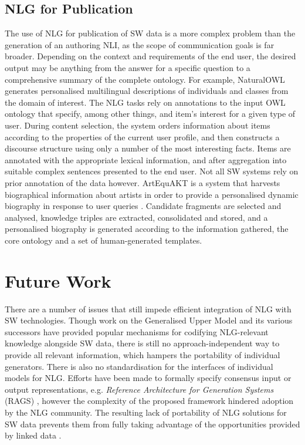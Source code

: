 \documentclass{acm_proc_article-sp}
\begin{document}
\subsection{NLG for Publication}
The use of NLG for publication of SW data is a more complex problem than the generation of an authoring NLI, as the scope of communication goals is far broader. Depending on the context and requirements of the end user, the desired output may be anything from the answer for a specific question to a comprehensive summary of the complete ontology.
For example, NaturalOWL \cite{56} generates personalised multilingual descriptions of individuals and classes from the domain of interest. The NLG tasks rely on annotations to the input OWL ontology that specify, among other things, and item's interest for a given type of user. During content selection, the system orders information about items according to the properties of the current user profile, and then constructs a discourse structure using only a number of the most interesting facts. Items are annotated with the appropriate lexical information, and after aggregation into suitable complex sentences presented to the end user.
Not all SW systems rely on prior annotation of the data however. ArtEquAKT is a system that harvests biographical information about artists in order to provide a personalised dynamic biography in response to user queries \cite{121}. Candidate fragments are selected and analysed, knowledge triples are extracted, consolidated and stored, and a personalised biography is generated according to the information gathered, the core ontology and a set of human-generated templates.


\section{Future Work}
There are a number of issues that still impede efficient integration of NLG with SW technologies. Though work on the Generalised Upper Model \cite{10} and its various successors have provided popular mechanisms for codifying NLG-relevant knowledge alongside SW data, there is still no approach-independent way to provide all relevant information, which hampers the portability of individual generators. There is also no standardisation for the interfaces of individual models for NLG. Efforts have been made to formally specify consensus input or output representations, e.g. \textit{Reference Architecture for Generation Systems} (RAGS) \cite{88}, however the complexity of the proposed framework hindered adoption by the NLG community. The resulting lack of portability of NLG solutions for SW data prevents them from fully taking advantage of the opportunities provided by linked data \cite{22}.
\end{document}
